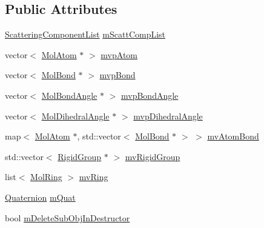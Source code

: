 \subsection*{Public Attributes}
\begin{DoxyCompactItemize}
\item 
\mbox{\hyperlink{class_obj_cryst_1_1_scattering_component_list}{Scattering\+Component\+List}} \mbox{\hyperlink{class_obj_cryst_1_1_molecule_ae681f50b04c32c7139727c675dc04b67}{m\+Scatt\+Comp\+List}}
\item 
vector$<$ \mbox{\hyperlink{class_obj_cryst_1_1_mol_atom}{Mol\+Atom}} $\ast$ $>$ \mbox{\hyperlink{class_obj_cryst_1_1_molecule_ad498c51ecf4ee0b4482e5fe41cd52be7}{mvp\+Atom}}
\item 
vector$<$ \mbox{\hyperlink{class_obj_cryst_1_1_mol_bond}{Mol\+Bond}} $\ast$ $>$ \mbox{\hyperlink{class_obj_cryst_1_1_molecule_aabf6e0daf6f90f4052a44888f2bc3d7b}{mvp\+Bond}}
\item 
vector$<$ \mbox{\hyperlink{class_obj_cryst_1_1_mol_bond_angle}{Mol\+Bond\+Angle}} $\ast$ $>$ \mbox{\hyperlink{class_obj_cryst_1_1_molecule_a9c195054308e17604a24a3127e0cb307}{mvp\+Bond\+Angle}}
\item 
vector$<$ \mbox{\hyperlink{class_obj_cryst_1_1_mol_dihedral_angle}{Mol\+Dihedral\+Angle}} $\ast$ $>$ \mbox{\hyperlink{class_obj_cryst_1_1_molecule_a21384a0b8be7bf3fc539c57d90d5c9a2}{mvp\+Dihedral\+Angle}}
\item 
map$<$ \mbox{\hyperlink{class_obj_cryst_1_1_mol_atom}{Mol\+Atom}} $\ast$, std\+::vector$<$ \mbox{\hyperlink{class_obj_cryst_1_1_mol_bond}{Mol\+Bond}} $\ast$ $>$ $>$ \mbox{\hyperlink{class_obj_cryst_1_1_molecule_ad67f767fe62aeef49aef1c5760d69294}{mv\+Atom\+Bond}}
\item 
std\+::vector$<$ \mbox{\hyperlink{class_obj_cryst_1_1_rigid_group}{Rigid\+Group}} $\ast$ $>$ \mbox{\hyperlink{class_obj_cryst_1_1_molecule_a43939b3e3ad83065cf7ccb6065a53a12}{mv\+Rigid\+Group}}
\item 
list$<$ \mbox{\hyperlink{class_obj_cryst_1_1_mol_ring}{Mol\+Ring}} $>$ \mbox{\hyperlink{class_obj_cryst_1_1_molecule_a35cb61305129b6bbda4a0bb014b2c90e}{mv\+Ring}}
\item 
\mbox{\hyperlink{class_obj_cryst_1_1_quaternion}{Quaternion}} \mbox{\hyperlink{class_obj_cryst_1_1_molecule_a61b83701b288c4fdbcda97b14608af7d}{m\+Quat}}
\item 
bool \mbox{\hyperlink{class_obj_cryst_1_1_molecule_a5b35796cbf31728b39b82c36badaa97b}{m\+Delete\+Sub\+Obj\+In\+Destructor}}
\item 

\end{DoxyCompactItemize}
